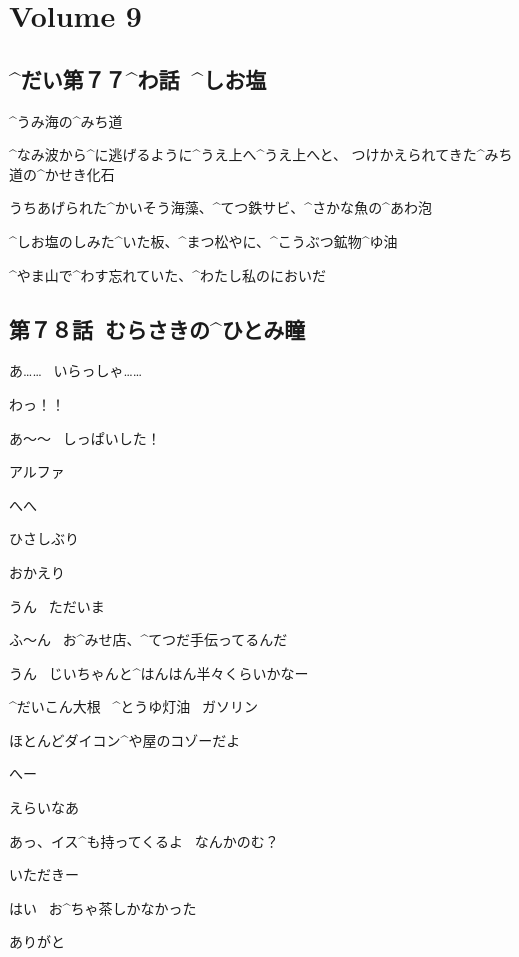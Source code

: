 \section{Volume 9}

\subsection{^{だい}{第}７７^{わ}{話}\ ^{しお}{塩}}

\page[5]
\Alpha ^{うみ}{海}の^{みち}{道}

\Alpha ^{なみ}{波}から^{に}{逃}げるように^{うえ}{上}へ^{うえ}{上}へと、
つけかえられてきた^{みち}{道}の^{かせき}{化石}

\page[8]
\Alpha うちあげられた^{かいそう}{海藻}、^{てつ}{鉄}サビ、^{さかな}{魚}の^{あわ}{泡}

\Alpha ^{しお}{塩}のしみた^{いた}{板}、^{まつ}{松}やに、^{こうぶつ}{鉱物}^{ゆ}{油}

\page
\Alpha ^{やま}{山}で^{わす}{忘}れていた、^{わたし}{私}のにおいだ


\subsection{第７８話\ むらさきの^{ひとみ}{瞳}}

\page[15]
\Takahiro あ……
\ いらっしゃ……

\page
\Alpha わっ！！

\Alpha あ〜〜
\ しっぱいした！

\Takahiro アルファ

\Alpha へへ

\Alpha ひさしぶり

\page
\Takahiro おかえり

\Alpha うん
\ ただいま

\Alpha ふ〜ん
\ お^{みせ}{店}、^{てつだ}{手伝}ってるんだ

\Takahiro うん
\ じいちゃんと^{はんはん}{半々}くらいかなー

\Sign ^{だいこん}{大根}
\ ^{とうゆ}{灯油}
\ ガソリン

\Takahiro ほとんどダイコン^{や}{屋}のコゾーだよ

\Alpha へー

\page
\Alpha えらいなあ

\Takahiro あっ、イス^{も}{持}ってくるよ
\ なんかのむ？

\Alpha いただきー

\page
\Takahiro はい
\ お^{ちゃ}{茶}しかなかった

\Alpha ありがと

